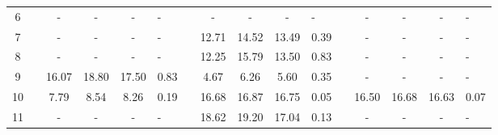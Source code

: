 \begin{table}
\begin{tabular}{ccccc>{\centering}p{0.75cm}cccc>{\centering}p{0.75cm}cccc>{\centering}p{0.75cm}}
\cline{1-6} \cline{8-11} \cline{13-16} 
{\scriptsize{6}} &  & {\scriptsize{-}} & {\scriptsize{-}} & {\scriptsize{-}} & {\scriptsize{-}} &  & {\scriptsize{-}} & {\scriptsize{-}} & {\scriptsize{-}} & {\scriptsize{-}} &  & {\scriptsize{-}} & {\scriptsize{-}} & {\scriptsize{-}} & {\scriptsize{-}}\tabularnewline
\cline{1-6} \cline{8-11} \cline{13-16} 
{\scriptsize{7}} &  & {\scriptsize{-}} & {\scriptsize{-}} & {\scriptsize{-}} & {\scriptsize{-}} &  & {\scriptsize{12.71}} & {\scriptsize{14.52}} & {\scriptsize{13.49}} & {\scriptsize{0.39}} &  & {\scriptsize{-}} & {\scriptsize{-}} & {\scriptsize{-}} & {\scriptsize{-}}\tabularnewline
\cline{1-6} \cline{8-11} \cline{13-16} 
{\scriptsize{8}} &  & {\scriptsize{-}} & {\scriptsize{-}} & {\scriptsize{-}} & {\scriptsize{-}} &  & {\scriptsize{12.25}} & {\scriptsize{15.79}} & {\scriptsize{13.50}} & {\scriptsize{0.83}} &  & {\scriptsize{-}} & {\scriptsize{-}} & {\scriptsize{-}} & {\scriptsize{-}}\tabularnewline
\cline{1-6} \cline{8-11} \cline{13-16} 
{\scriptsize{9}} &  & {\scriptsize{16.07}} & {\scriptsize{18.80}} & {\scriptsize{17.50}} & {\scriptsize{0.83}} &  & {\scriptsize{4.67}} & {\scriptsize{6.26}} & {\scriptsize{5.60}} & {\scriptsize{0.35}} &  & {\scriptsize{-}} & {\scriptsize{-}} & {\scriptsize{-}} & {\scriptsize{-}}\tabularnewline
\cline{1-6} \cline{8-11} \cline{13-16} 
{\scriptsize{10}} &  & {\scriptsize{7.79}} & {\scriptsize{8.54}} & {\scriptsize{8.26}} & {\scriptsize{0.19}} &  & {\scriptsize{16.68}} & {\scriptsize{16.87}} & {\scriptsize{16.75}} & {\scriptsize{0.05}} &  & {\scriptsize{16.50}} & {\scriptsize{16.68}} & {\scriptsize{16.63}} & {\scriptsize{0.07}}\tabularnewline
\cline{1-6} \cline{8-11} \cline{13-16} 
{\scriptsize{11}} &  & {\scriptsize{-}} & {\scriptsize{-}} & {\scriptsize{-}} & {\scriptsize{-}} &  & {\scriptsize{18.62}} & {\scriptsize{19.20}} & {\scriptsize{17.04}} & {\scriptsize{0.13}} &  & {\scriptsize{-}} & {\scriptsize{-}} & {\scriptsize{-}} & {\scriptsize{-}}\tabularnewline
\hline 
\end{tabular}
\end{table}


